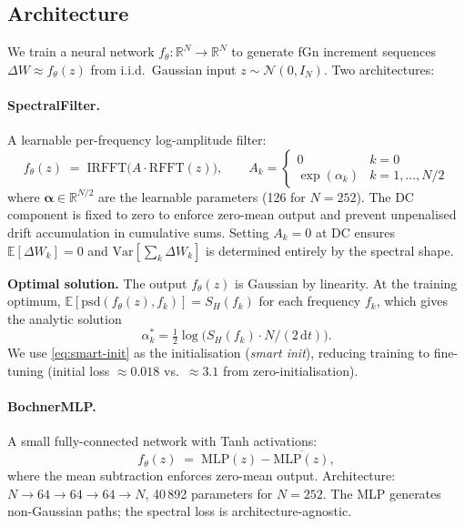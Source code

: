 \documentclass[11pt,a4paper]{article}
\newcommand{\R}{\mathbb{R}}
\newcommand{\E}{\mathbb{E}}
\begin{document}
\subsection{Architecture}

We train a neural network $f_\theta : \R^N \to \R^N$ to generate fGn
increment sequences $\Delta W \approx f_\theta(z)$ from i.i.d.\ Gaussian
input $z \sim \mathcal{N}(0, I_N)$. Two architectures:

\paragraph{SpectralFilter.} A learnable per-frequency log-amplitude filter:
\begin{equation}
 f_\theta(z) \;=\; \mathrm{IRFFT}\!\bigl(A \cdot \mathrm{RFFT}(z)\bigr),
 \qquad
 A_k = \begin{cases} 0 & k = 0 \\ \exp(\alpha_k) & k = 1,\ldots, N/2 \end{cases}
 \label{eq:spectral-filter}
\end{equation}
where $\boldsymbol{\alpha} \in \R^{N/2}$ are the learnable parameters
(126 for $N=252$). The DC component is fixed to zero to enforce
zero-mean output and prevent unpenalised drift accumulation in cumulative
sums. Setting $A_k = 0$ at DC ensures $\E[\Delta W_k] = 0$ and
$\mathrm{Var}[\sum_k \Delta W_k]$ is determined entirely by the
spectral shape.

\textbf{Optimal solution.} The output $f_\theta(z)$ is Gaussian by
linearity. At the training optimum, $\E[\mathrm{psd}(f_\theta(z), f_k)]
= S_H(f_k)$ for each frequency $f_k$, which gives the analytic solution
\begin{equation}
 \alpha_k^* = \tfrac{1}{2}\log\!\bigl(S_H(f_k) \cdot N / (2\,\mathrm{d}t)\bigr).
 \label{eq:smart-init}
\end{equation}
We use \eqref{eq:smart-init} as the initialisation (\emph{smart init}),
reducing training to fine-tuning (initial loss $\approx 0.018$ vs.\
$\approx 3.1$ from zero-initialisation).

\paragraph{BochnerMLP.} A small fully-connected network with Tanh
activations:
\begin{equation}
 f_\theta(z) \;=\; \mathrm{MLP}(z) - \overline{\mathrm{MLP}(z)},
 \label{eq:mlp}
\end{equation}
where the mean subtraction enforces zero-mean output. Architecture:
$N \to 64 \to 64 \to 64 \to N$, 40\,892 parameters for $N=252$.
The MLP generates non-Gaussian paths; the spectral loss is
architecture-agnostic.
\end{document}
